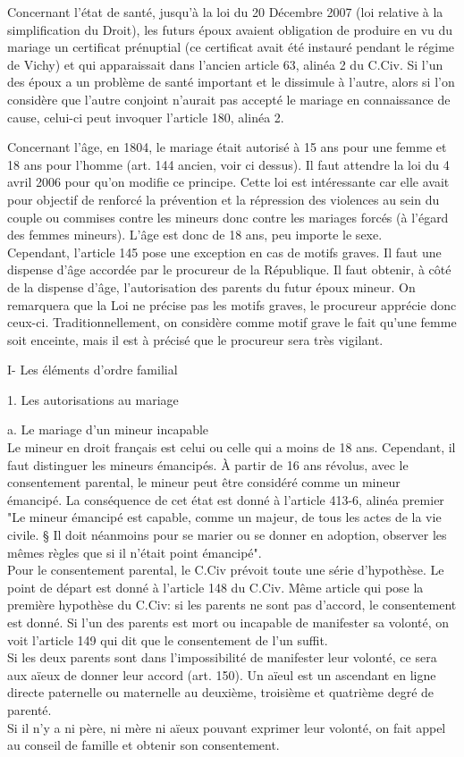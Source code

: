 \documentclass[12pt, a4paper, openany]{book}
\begin{document}
Concernant l'état de santé, jusqu'à la loi du 20 Décembre 2007 (loi relative à la simplification du Droit), les futurs époux avaient obligation de produire en vu du mariage un certificat prénuptial (ce certificat avait été instauré pendant le régime de Vichy) et qui apparaissait dans l'ancien article 63, alinéa 2 du C.Civ. Si l'un des époux a un problème de santé important et le dissimule à l'autre, alors si l'on considère que l'autre conjoint n'aurait pas accepté le mariage en connaissance de cause, celui-ci peut invoquer l'article 180, alinéa 2.


Concernant l'âge, en 1804, le mariage était autorisé à 15 ans pour une femme et 18 ans pour l'homme (art. 144 ancien, voir ci dessus). Il faut attendre la loi du 4 avril 2006 pour qu'on modifie ce principe. Cette loi est intéressante car elle avait pour objectif de renforcé la prévention et la répression des violences au sein du couple ou commises contre les mineurs donc contre les mariages forcés (à l'égard des femmes mineurs). L'âge est donc de 18 ans, peu importe le sexe. \\
Cependant, l'article 145 pose une exception en cas de motifs graves. Il faut une dispense d'âge accordée par le procureur de la République. Il faut obtenir, à côté de la dispense d'âge, l'autorisation des parents du futur époux mineur. On remarquera que la Loi ne précise pas les motifs graves, le procureur apprécie donc ceux-ci. Traditionnellement, on considère comme motif grave le fait qu'une femme soit enceinte, mais il est à précisé que le procureur sera très vigilant. 


I- Les éléments d'ordre familial


1. Les autorisations au mariage


a. Le mariage d'un mineur incapable \\
Le mineur en droit français est celui ou celle qui a moins de 18 ans. Cependant, il faut distinguer les mineurs émancipés. À partir de 16 ans révolus, avec le consentement parental, le mineur peut être considéré comme un mineur émancipé. La conséquence de cet état est donné à l'article 413-6, alinéa premier "Le mineur émancipé est capable, comme un majeur, de tous les actes de la vie civile. § Il doit néanmoins pour se marier ou se donner en adoption, observer les mêmes règles que si il n'était point émancipé". \\
Pour le consentement parental, le C.Civ prévoit toute une série d'hypothèse. Le point de départ est donné à l'article 148 du C.Civ. Même article qui pose la première hypothèse du C.Civ: si les parents ne sont pas d'accord, le consentement est donné. Si l'un des parents est mort ou incapable de manifester sa volonté, on voit l'article 149 qui dit que le consentement de l'un suffit. \\
Si les deux parents sont dans l'impossibilité de manifester leur volonté, ce sera aux aïeux de donner leur accord (art. 150). Un aïeul est un ascendant en ligne directe paternelle ou maternelle au deuxième, troisième et quatrième degré de parenté. \\
Si il n'y a ni père, ni mère ni aïeux pouvant exprimer leur volonté, on fait appel au conseil de famille et obtenir son consentement. 
\end{document}

